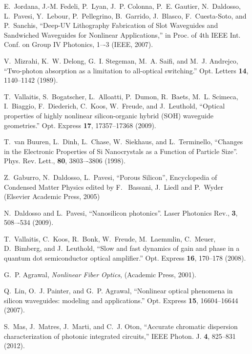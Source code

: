 \begin{thebibliography}{10}
E.~Jordana, J.-M. Fedeli, P.~Lyan, J.~P. Colonna, P.~E. Gautier, N.~Daldosso,
  L.~Pavesi, Y.~Lebour, P.~Pellegrino, B.~Garrido, J.~Blasco, F.~Cuesta-Soto,
  and P.~Sanchis, \enquote{{Deep-UV Lithography Fabrication of Slot Waveguides
  and Sandwiched Waveguides for Nonlinear Applications},} in Proc. of 4th IEEE Int. Conf. on Group IV Photonics, 1–-3 (IEEE, 2007).
  
V.~Mizrahi, K.~W. Delong, G.~I. Stegeman, M.~A. Saifi, and M.~J. Andrejco,
  \enquote{{Two-photon absorption as a limitation to all-optical switching.}}
  Opt. Letters \textbf{14}, 1140--1142 (1989).

T.~Vallaitis, S.~Bogatscher, L.~Alloatti, P.~Dumon, R.~Baets, M.~L. Scimeca,
  I.~Biaggio, F.~Diederich, C.~Koos, W.~Freude, and J.~Leuthold,
  \enquote{{Optical properties of highly nonlinear silicon-organic hybrid (SOH)
  waveguide geometries.}} Opt. Express \textbf{17}, 17357--17368 (2009).
  
T.~van Buuren, L.~Dinh, L.~Chase, W.~Siekhaus, and L.~Terminello, \enquote{{Changes in the Electronic Properties of Si Nanocrystals as a Function of Particle Size}}. Phys. Rev. Lett., \textbf{80}, 3803–-3806 (1998).

Z.~Gaburro, N.~Daldosso, L.~Pavesi, \enquote{Porous Silicon}, Encyclopedia of Condensed Matter Physics edited by F.~ Bassani, J.~Liedl and P.~Wyder (Elsevier Academic Press, 2005)

N.~Daldosso and L.~Pavesi, \enquote{Nanosilicon photonics}. Laser Photonics Rev., \textbf{3}, 508–-534 (2009).

T.~Vallaitis, C.~Koos, R.~Bonk, W.~Freude, M.~Laemmlin, C.~Meuer, D.~Bimberg,
  and J.~Leuthold, \enquote{{Slow and fast dynamics of gain and phase in a
  quantum dot semiconductor optical amplifier.}} Opt. Express \textbf{16},
  170--178 (2008).

G.~P. Agrawal, \emph{{Nonlinear Fiber Optics}}, (Academic Press, 2001).

Q.~Lin, O.~J. Painter, and G.~P. Agrawal, \enquote{{Nonlinear optical phenomena
  in silicon waveguides: modeling and applications.}} Opt. Express
  \textbf{15}, 16604--16644 (2007).

S.~Mas, J.~Matres, J.~Marti, and C.~J. Oton, \enquote{{Accurate chromatic
  dispersion characterization of photonic integrated circuits},} IEEE Photon. J. \textbf{4}, 825--831 (2012).

\end{thebibliography}

